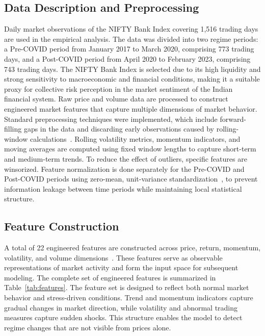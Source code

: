 \documentclass[runningheads,10pt]{llncs}
\begin{document}
\subsection{Data Description and Preprocessing}

Daily market observations of the NIFTY Bank Index covering 1,516 trading days are used in the empirical analysis. The data was divided into two regime periods: a Pre-COVID period from January 2017 to March 2020, comprising 773 trading days, and a Post-COVID period from April 2020 to February 2023, comprising 743 trading days. The NIFTY Bank Index is selected due to its high liquidity and strong sensitivity to macroeconomic and financial conditions, making it a suitable proxy for collective risk perception in the market sentiment of the Indian financial system. Raw price and volume data are processed to construct engineered market features that capture multiple dimensions of market behavior. Standard preprocessing techniques were implemented, which include forward-filling gaps in the data and discarding early observations caused by rolling-window calculations~\cite{hamilton1989}. Rolling volatility metrics, momentum indicators, and moving averages are computed using fixed window lengths to capture short-term and medium-term trends. To reduce the effect of outliers, specific features are winsorized. Feature normalization is done separately for the Pre-COVID and Post-COVID periods using zero-mean, unit-variance standardization~\cite{gu2020}, to prevent information leakage between time periods while maintaining local statistical structure.
\vspace{-10pt}
\subsection{Feature Construction}

A total of 22 engineered features are constructed across price, return, momentum, volatility, and volume dimensions~\cite{gu2020,farmer2019}. These features serve as observable representations of market activity and form the input space for subsequent modeling. The complete set of engineered features is summarized in Table~\ref{tab:features}. The feature set is designed to reflect both normal market behavior and stress-driven conditions. Trend and momentum indicators capture gradual changes in market direction, while volatility and abnormal trading measures capture sudden shocks. This structure enables the model to detect regime changes that are not visible from prices alone.
\end{document}

